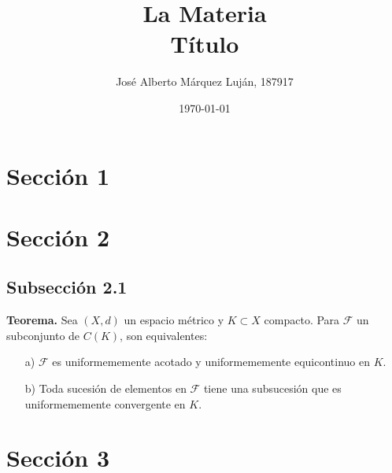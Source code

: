\documentclass[12pt]{article}
\title{
    La Materia \\
    \large Título
}
\author{José Alberto Márquez Luján, 187917}
\date{\today}
\begin{document}
\maketitle
\thispagestyle{firststyle}


\section{Sección 1}
\lipsum[1-3]

\section{Sección 2}
\lipsum[4-6]

\subsection{Subsección 2.1}
\lipsum[7-8]

\textbf{Teorema.} Sea $(X,d)$ un espacio métrico y $K \subset X$ compacto. Para $\mathcal{F}$ un subconjunto de $C(K)$, son equivalentes:
\begin{itemize}
    \item[a)] $\mathcal{F}$ es uniformememente acotado y uniformememente equicontinuo en $K$.
    \item[b)] Toda sucesión de elementos en $\mathcal{F}$ tiene una subsucesión que es uniformememente convergente en $K$.
\end{itemize}

\lipsum[9]

\section{Sección 3}
\lipsum[10-14]

\end{document}
